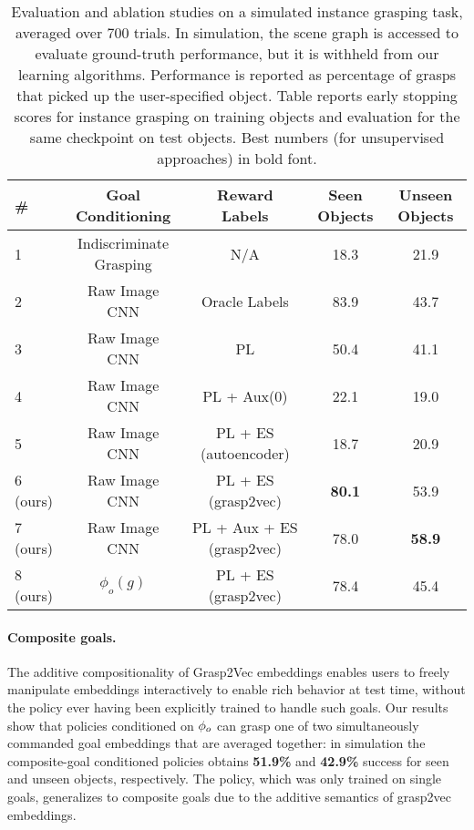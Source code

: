 \documentclass{article}
\begin{document}
\begin{table}[h]

\begin{center}
\begin{tabular}{|l|c|c|c|c|}
\hline
\# & Goal Conditioning & Reward Labels & Seen Objects & Unseen Objects\\
\hline
1 & Indiscriminate Grasping & N/A & 18.3 & 21.9 \\
2 & Raw Image CNN & Oracle Labels & 83.9 & 43.7 \\
\hline
3 & Raw Image CNN & PL & 50.4 & 41.1 \\
4 & Raw Image CNN & PL + Aux(0) & 22.1 & 19.0 \\
5 & Raw Image CNN & PL + ES (autoencoder) & 18.7 & 20.9 \\
\hline
6 (ours) & Raw Image CNN & PL + ES (grasp2vec) & \textbf{80.1} & 53.9  \\
7 (ours) & Raw Image CNN & PL + Aux + ES (grasp2vec) & 78.0 & \textbf{58.9} \\
8 (ours)& $\phi_o(g)$& PL + ES (grasp2vec)& 78.4 & 45.4 \\
\hline
\end{tabular}

\end{center}
\caption{Evaluation and ablation studies on a simulated instance grasping task, averaged over 700 trials. In simulation, the scene graph is accessed to evaluate ground-truth performance, but it is withheld from our learning algorithms. Performance is reported as percentage of grasps that picked up the user-specified object. Table reports early stopping scores for instance grasping on training objects and evaluation for the same checkpoint on test objects. Best numbers (for unsupervised approaches) in bold font.\label{table:grasping}}
\end{table}


\paragraph{Composite goals.}
The additive compositionality of Grasp2Vec embeddings enables users to freely manipulate embeddings interactively to enable rich behavior at test time, without the policy ever having been explicitly trained to handle such goals. Our results show that policies conditioned on $\phi_o$ can grasp one of two simultaneously commanded goal embeddings that are averaged together: in simulation the composite-goal conditioned policies obtains \textbf{51.9\%} and \textbf{42.9\%} success for seen and unseen objects, respectively. The policy, which was only trained on single goals, generalizes to composite goals due to the additive semantics of grasp2vec embeddings.
\end{document}
